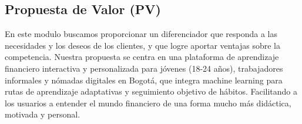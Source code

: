 {}
\subsection*{Propuesta de Valor (PV)}

En este modulo buscamos proporcionar un diferenciador que responda a las necesidades y los deseos de los clientes, y que logre aportar ventajas sobre la competencia. Nuestra propuesta se centra en una plataforma de aprendizaje financiero interactiva y personalizada para jóvenes (18-24 años), trabajadores informales y nómadas digitales en Bogotá, que integra machine learning para rutas de aprendizaje adaptativas y seguimiento objetivo de hábitos. Facilitando a los usuarios a entender el mundo financiero de una forma mucho más didáctica, motivada y personal.
